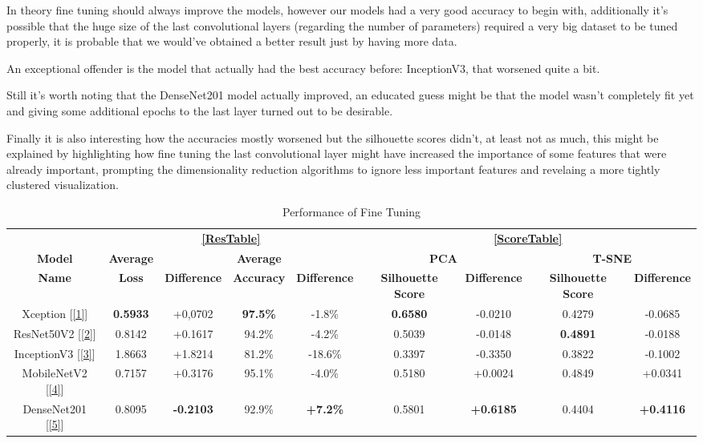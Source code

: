 \documentclass[conference]{IEEEtran}
\begin{document}
In theory fine tuning should always improve the models, however our models had a very good accuracy to begin with, additionally it's possible that the huge size of the last convolutional layers (regarding the number of parameters) required a very big dataset to be tuned properly, it is probable that we would've obtained a better result just by having more data.

An exceptional offender is the model that actually had the best accuracy before: InceptionV3, that worsened quite a bit.

Still it's worth noting that the DenseNet201 model actually improved, an educated guess might be that the model wasn't completely fit yet and giving some additional epochs to the last layer turned out to be desirable.

Finally it is also interesting how the accuracies mostly worsened but the silhouette scores didn't, at least not as much, this might be explained by highlighting how fine tuning the last convolutional layer might have increased the importance of some features that were already important, prompting the dimensionality reduction algorithms to ignore less important features and revelaing a more tightly clustered visualization.

\begin{table}[htbp]
\caption{Performance of Fine Tuning}
\begin{center}
\begin{tabular}{|c|c|c|c|c|c|c|c|c|}
\hline
& \multicolumn{4}{|c|}{\textbf{\ref{ResTable}}} & \multicolumn{4}{|c|}{\textbf{\ref{ScoreTable}}}\\
\cline{2-9}
\textbf{Model} & \textbf{Average} && \textbf{Average} && \multicolumn{2}{|c|}{\textbf{PCA}} &\multicolumn{2}{|c|}{\textbf{T-SNE}}\\
\cline{6-9}
\textbf{Name} & \textbf{Loss} & \textbf{Difference} & \textbf{Accuracy} & \textbf{Difference} & \textbf{Silhouette Score} & \textbf{Difference} & \textbf{Silhouette Score} & \textbf{Difference}\\     
\hline
\hline
Xception [\ref{1}] & \textbf{0.5933} & +0,0702 & \textbf{97.5\%} & -1.8\% & \textbf{0.6580} & -0.0210 & 0.4279 & -0.0685\\
\hline
ResNet50V2 [\ref{2}] & 0.8142 & +0.1617 & 94.2\% & -4.2\% & 0.5039 & -0.0148 & \textbf{0.4891} & -0.0188\\
\hline
InceptionV3 [\ref{3}] & 1.8663 & +1.8214 & 81.2\% & -18.6\% & 0.3397 & -0.3350 & 0.3822 & -0.1002\\
\hline
MobileNetV2 [\ref{4}] & 0.7157 & +0.3176 & 95.1\% & -4.0\% & 0.5180 & +0.0024 & 0.4849 & +0.0341\\
\hline
DenseNet201 [\ref{5}] & 0.8095 & \textbf{-0.2103} & 92.9\% & \textbf{+7.2\%} & 0.5801 & \textbf{+0.6185} & 0.4404 & \textbf{+0.4116}\\
\hline
\end{tabular}
\label{FineTable}
\end{center}
\end{table}
\end{document}
